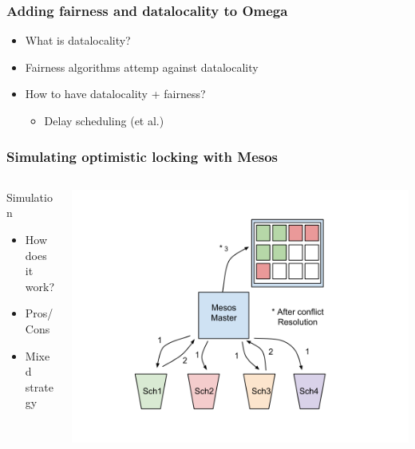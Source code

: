 \documentclass[notes=hide]{beamer}
\begin{document}
  \begin{frame}
    \frametitle{Adding fairness and datalocality to Omega}
    \begin{itemize}
      \item What is datalocality?
      \item Fairness algorithms attemp against datalocality
      \item How to have datalocality + fairness?
      \begin{itemize}
        \item Delay scheduling (et al.)
      \end{itemize}
    \end{itemize}
  \end{frame}

  \note{}

  \begin{frame}
    \frametitle{Simulating optimistic locking with Mesos}
       \begin{columns}[T]
       \begin{column}{.4\textwidth}
        \begin{block}{Simulation}
            \begin{itemize}
              \item How does it work?
              \item Pros/Cons
              \item Mixed strategy
            \end{itemize}
         \end{block}
       \end{column}
       \begin{column}{.65\textwidth}
         \includegraphics[trim = 63mm 20mm 0mm 20mm,clip,scale=0.35,natwidth=960,natheight=720]{MesosOptimisticLocking-slides.png}
       \end{column}
       \end{columns}
  \end{frame}
\end{document}
